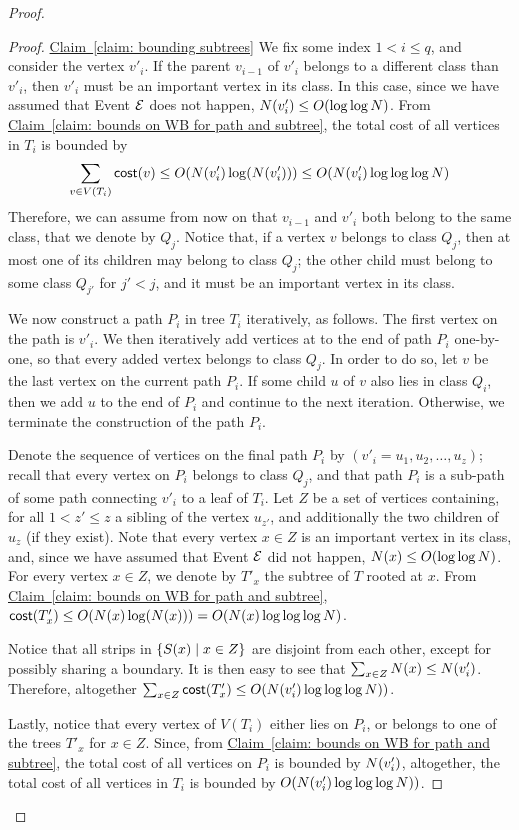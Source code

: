 \documentclass[11pt]{article}
\numberwithin{equation}{section}
\theoremstyle{definition}
\theoremstyle{plain}
\newcommand{\expref}[2]{\hyperref[#2]{#1~\ref{#2}}}
\begin{document}
\begin{proof}
\begin{proof}{\expref{Claim}{claim: bounding subtrees}}
We fix some index $1<i\leq q$, and consider the vertex $v'_i$. If the parent $v_{i-1}$ of $v'_i$ belongs to a different class than $v'_i$, then $v'_i$ must be an important vertex in its class. In this case, since we have assumed that Event ${\cal{E}}$ does not happen, $N(v'_i)\leq O(\log\log N)$. 
From \expref{Claim}{claim: bounds on WB for path and subtree}, the total cost of all vertices in $T_i$ is bounded by 
$$\sum_{v \in V(T_i)} \mathsf{cost}(v) \leq O(N(v'_i)\log(N(v'_i)))\leq O(N(v'_i)\log\log\log N)$$  
Therefore, we can assume from now on that $v_{i-1}$ and $v'_i$ both belong to the same class, that we denote by $Q_j$.
Notice that, if a vertex $v$ belongs to class $Q_j$, then at most one of its children may belong to class $Q_j$; the other child must belong to some class $Q_{j'}$ for $j'<j$, and it must be an important vertex in its class.

We now construct a path $P_i$ in tree $T_i$ iteratively, as follows. 
The first vertex on the path is $v'_i$. 
We then iteratively add vertices at to the end of path $P_i$ one-by-one, so that every added vertex belongs to class $Q_j$. 
In order to do so, let $v$ be the last vertex on the current path $P_i$. 
If some child $u$ of $v$ also lies in class $Q_i$, then we add $u$ to the end of $P_i$ and continue to the next iteration. 
Otherwise, we terminate the construction of the path $P_i$.


Denote the sequence of vertices on the final path $P_i$ by $(v'_i=u_1,u_2,\ldots,u_z)$; recall that every vertex on $P_i$ belongs to class $Q_j$, and that path $P_i$ is a sub-path of some path connecting $v'_i$ to a leaf of $T_i$. Let $Z$ be a set of vertices containing, for all $1<z'\leq z$ a sibling of the vertex $u_{z'}$, and additionally the two children of $u_z$ (if they exist). Note that every vertex $x\in Z$ is an important vertex in its class, and, since we have assumed that Event ${\cal{E}}$ did not happen, $N(x)\leq O(\log\log N)$. For every vertex $x\in Z$, we denote by $T'_x$ the subtree of $T$ rooted at $x$. From \expref{Claim}{claim: bounds on WB for path and subtree}, $\mathsf{cost}(T'_x)\leq O(N(x)\log(N(x)))=O(N(x)\log\log\log N)$.

Notice that all strips in $\left\{ S(x)\mid x\in Z \right\}$ are disjoint from each other, except for possibly sharing a boundary. It is then easy to see that $\sum_{x\in Z}N(x)\leq N(v'_i)$. Therefore, altogether $\sum_{x\in Z}\mathsf{cost}(T'_x)\leq O(N(v'_i)\log\log\log N))$.

Lastly, notice that every vertex of $V(T_i)$ either lies on $P_i$, or belongs to one of the trees $T'_x$ for $x\in Z$. Since, from \expref{Claim}{claim: bounds on WB for path and subtree}, the total cost of all vertices on $P_i$ is bounded by $N(v'_i)$, altogether, the total cost of all vertices in $T_i$ is bounded by $O(N(v'_i)\log\log\log N))$.
\end{proof}
\end{proof}
\end{document}
